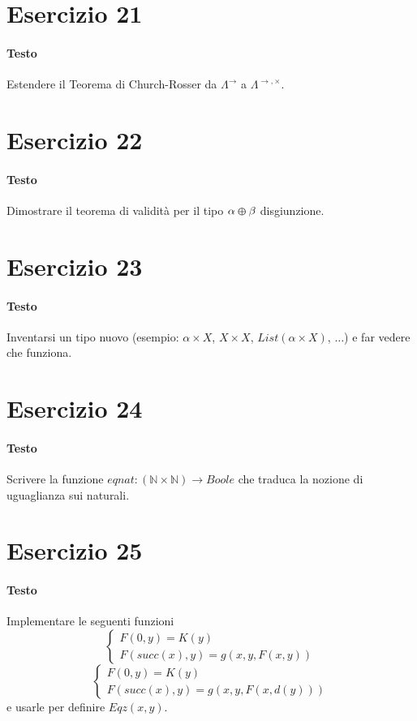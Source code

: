 \documentclass[a4paper,11pt]{article}
\begin{document}
\section*{Esercizio 21}
\paragraph{Testo}
Estendere il Teorema di Church-Rosser da $\Lambda^\rightarrow$ a $\Lambda^{\rightarrow, \times}$.

\section*{Esercizio 22}
\paragraph{Testo}
Dimostrare il teorema di validità per il tipo $\alpha \varoplus \beta$ disgiunzione.

\section*{Esercizio 23}
\paragraph{Testo}
Inventarsi un tipo nuovo (esempio: $\alpha \times X$, $X \times X$, $List(\alpha \times X)$, $\dots$) e far vedere che funziona.

\section*{Esercizio 24}
\paragraph{Testo}
Scrivere la funzione $eqnat : (\mathbb{N} \times \mathbb{N}) \rightarrow Boole$ che traduca la nozione di uguaglianza sui naturali.

\section*{Esercizio 25}
\paragraph{Testo}
Implementare le seguenti funzioni
$$\begin{cases} F(0,y) = K(y) \\ F(succ(x),y) = g(x,y,F(x,y)) \end{cases}$$
$$\begin{cases} F(0,y) = K(y) \\ F(succ(x),y) = g(x,y,F(x,d(y))) \end{cases}$$
e usarle per definire $Eqz(x,y)$.
\end{document}
